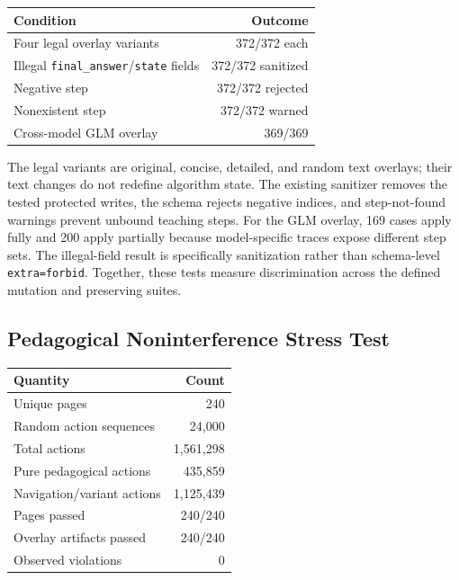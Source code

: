 \documentclass[letterpaper]{article}
\newenvironment{coltable}
  {\begin{center}\begin{minipage}{\columnwidth}\centering}
  {\end{minipage}\end{center}}
\begin{document}
\begin{coltable}
\small
\begin{tabular*}{\columnwidth}{@{\extracolsep{\fill}}lr@{}}
\toprule
Condition & Outcome \\
\midrule
Four legal overlay variants & 372/372 each \\
Illegal \texttt{final\_answer}/\texttt{state} fields & 372/372 sanitized \\
Negative step & 372/372 rejected \\
Nonexistent step & 372/372 warned \\
Cross-model GLM overlay & 369/369 \\
\bottomrule
\end{tabular*}
\label{tab:overlay-audit}
\end{coltable}

The legal variants are original, concise, detailed, and random text overlays; their text changes do not redefine algorithm state. The existing sanitizer removes the tested protected writes, the schema rejects negative indices, and step-not-found warnings prevent unbound teaching steps. For the GLM overlay, 169 cases apply fully and 200 apply partially because model-specific traces expose different step sets. The illegal-field result is specifically sanitization rather than schema-level \texttt{extra=forbid}. Together, these tests measure discrimination across the defined mutation and preserving suites.

\subsection{Pedagogical Noninterference Stress Test}

\begin{coltable}
\small
\begin{tabular}{@{}lr@{}}
\toprule
Quantity & Count \\
\midrule
Unique pages & 240 \\
Random action sequences & 24,000 \\
Total actions & 1,561,298 \\
Pure pedagogical actions & 435,859 \\
Navigation/variant actions & 1,125,439 \\
Pages passed & 240/240 \\
Overlay artifacts passed & 240/240 \\
Observed violations & 0 \\
\bottomrule
\end{tabular}
\label{tab:noninterference}
\end{coltable}
\end{document}
